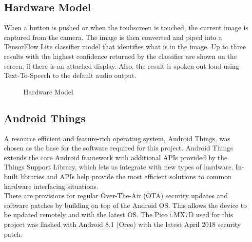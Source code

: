 \documentclass[a4paper,conference]{IEEEtran}
\begin{document}
	\subsection{Hardware Model} \label{subsection:hardware}

	When a button is pushed or when the touhscreen is touched, the current image is captured from the camera. The image is then converted and piped into a TensorFlow Lite classifier model that identifies what is in the image. Up to three results with the highest confidence returned by the classifier are shown on the screen, if there is an attached display. Also, the result is spoken out loud using Text-To-Speech to the default audio output.

	\begin{figure}[h] 
		\centering
		\centering
		\caption{Hardware Model}
		\label{fig:hardware}
		\end{figure}

		\subsection{Android Things} \label{subsection:android}

		A resource efficient and feature-rich operating system, Android Things, was chosen as the base for the software required for this project. Android Things extends the core Android framework with additional APIs provided by the Things Support Library, which lets us integrate with new types of hardware. In-built libraries and APIs help provide the most efficient solutions to common hardware interfacing situations.\\
		\newline
		There are provisions for regular Over-The-Air (OTA) security updates and software patches by building on top of the Android OS. This allows the device to be updated remotely and with the latest OS. The Pico i.MX7D used for this project was flashed with Android 8.1 (Oreo) with the latest April 2018 security patch.
\end{document}
